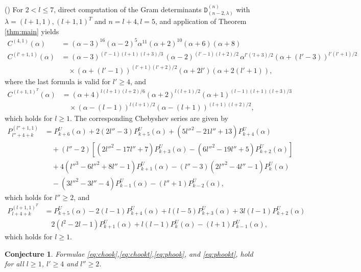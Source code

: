 \documentclass{article}
\newcommand{\ppm}[1]{\textcolor{red}{#1}}
\newcommand{\bajm}[1]{\textcolor{blue}{#1}}
\newtheorem{conjecture}{Conjecture}[theorem]
\theoremstyle{definition}
\newcommand{\mdef}{\refstepcounter{theorem}       \medskip \noindent ({\bf \thetheorem}) }
\newcommand{\Deltt}{{\mathtt D}}   %
\newcommand{\Delttt}[2]{\Deltt^{#1}_{(#2)}}  %
\def\nn{\nonumber}
\def\a{\alpha}
\def\l{\lambda}
\numberwithin{equation}{subsection}
\begin{document}
\mdef For $2<l\leq 7$, direct computation of the Gram determinants $\Delttt{(n)}{n-2,\l}$ with $\l=(l+1,1), (l+1,1)^T$ and $n=l+4,l=5$, and application of Theorem \ref{thm:main} yields
\begin{align}
    C^{(4,1)}(\a)&=(\alpha -3)^{16} (\alpha -2)^5 \alpha ^{11} (\alpha +2)^{10} (\alpha +6) (\alpha +8)\nn\\
    C^{(l'+1,1)}(\a)&=(\alpha -3)^{(l'-1)(l+1)(l+3)/3} \, (\alpha -2)^{(l'-1)(l+2)/2} \, \alpha ^{l'('l+3)/2}(\alpha +(l'-3))^{l'(l'+1)/2} \nn\\
    &\quad\times (\alpha +(l'-1))^{(l'+1)(l'+2)/2} (\alpha +2l') (\alpha +2(l'+1)),\label{eq:chook}
\end{align}
where the last formula is valid for $l'\geq 4$, and
\begin{align}
        C^{(l+1,1)^T}(\a)&=(\a+4)^{l(l+1)(l+2)/6}(\a+2)^{l(l+1)/2}(\a+1)^{(l-1)(l+1)(l+3)/3}\nn\\
    &\quad\times(\alpha -(l-1))^{l(l+1)/2} (\alpha -(l+1))^{(l+1)(l+2)/2},\label{eq:chookt}
\end{align}
which holds for $l\geq 1$. The corresponding Chebyshev series are given by
\begin{align}
    P_{l''+4+k}^{(l''+1,1)}&=P^U_{k+6}(\a)+2 (2 l''-3) P^U_{k+5}(\a)+(5 l''^2-21 l''+13)P^U_{k+4}(\a)\nn\\
    &\quad +(l''-2) \left[\left(2 l''^2-17 l''+7\right)P^U_{k+3}(\a)- \left(6 l''^2-19 l''+5\right) P^U_{k+2}(\a)\right]\nn\\
    &\quad +4 \left(l''^3-6 l''^2+8 l''-1\right)P^U_{k+1}(\a) -(l''-3) \left(2 l''^2-4 l''-1\right)P^U_{k}(\a)\nn\\
    &\quad-(3 l''^2-3 l''-4)P^U_{k-1}(\a)-(l''+1)P^U_{k-2}(\a),\label{eq:phook}\end{align}
which holds for $l''\geq2$, and 
\begin{align}
    P_{l+4+k}^{(l+1,1)^T}&=P^U_{k+5}(\a)-2 (l-1) P^U_{k+4}(\a)+l(l-5)P^U_{k+3}(\a)+3l(l-1)P^U_{k+2}(\a)\nn\\
    &\quad 2(l^2-2l-1) P^U_{k+1}(\a)+l(l-1)P^U_{k}(\a)-(l+1)P^U_{k-1}(\a),\label{eq:phookt}
\end{align}
which holds for $l\geq 1$.

 \begin{conjecture}Formulae \eqref{eq:chook},\eqref{eq:chookt},\eqref{eq:phook}, and \eqref{eq:phookt}, hold for all $l\geq 1$, $l'\geq 4$ and $l''\geq 2$.     
 \end{conjecture}
\medskip 
\end{document}
